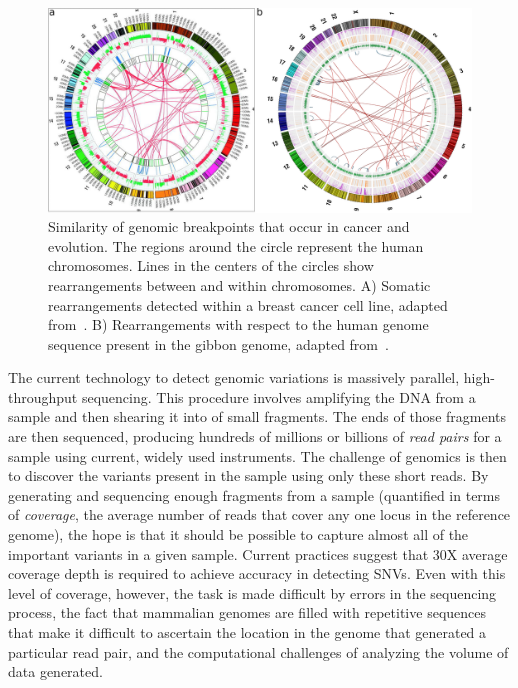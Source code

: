 \begin{figure}
\centering
\includegraphics[width=.9\textwidth]{figures/breakpoints_in_cancer_and_evolution.pdf}
\caption{Similarity of genomic breakpoints that occur in cancer and evolution. The regions around the circle represent the human chromosomes. Lines in the centers of the circles show rearrangements between and within chromosomes. A) Somatic rearrangements detected within a breast cancer cell line, adapted from~\cite{Hampton:2009fc}. B) Rearrangements with respect to the human genome sequence present in the gibbon genome, adapted from~\cite{Carbone:2009p1012}.}
\label{cancer_evolution_breakpoints}
\end{figure}

The current technology to detect genomic variations is massively parallel, high-throughput sequencing. This procedure involves amplifying the DNA from a sample and then shearing it into of small fragments. The ends of those fragments are then sequenced, producing hundreds of millions or billions of \emph{read pairs} for a sample using current, widely used instruments. The challenge of genomics is then to discover the variants present in the sample using only these short reads. By generating and sequencing enough fragments from a sample (quantified in terms of \emph{coverage}, the average number of reads that cover any one locus in the reference genome), the hope is that it should be possible to capture almost all of the important variants in a given sample. Current practices suggest that 30X average coverage depth is required to achieve accuracy in detecting SNVs. Even with this level of coverage, however, the task is made difficult by errors in the sequencing process, the fact that mammalian genomes are filled with repetitive sequences that make it difficult to ascertain the location in the genome that generated a particular read pair, and the computational challenges of analyzing the volume of data generated.

